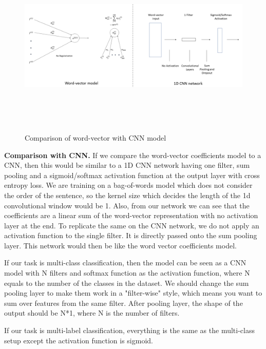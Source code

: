 \begin{figure}[htbp]
\centering
\includegraphics[width=16cm, height=8cm]{images/wv-cnn.png}\\
\centering
\caption{Comparison of word-vector with CNN model}
\label{fig:foo}
\end{figure}
\textbf{Comparison with CNN.} If we compare the word-vector coefficients model to a CNN, then this would be similar to a 1D CNN network having one filter, sum pooling and a sigmoid/softmax activation function at the output layer with cross entropy loss. We are training on a bag-of-words model which does not consider the order of the sentence, so the kernel size which decides the length of the 1d convolutional window would be 1. Also, from our network we can see that the coefficients are a linear sum of the word-vector representation with no activation layer at the end. To replicate the same on the CNN network, we do not apply an activation function to the single filter. It is directly passed onto the sum pooling layer. This network would then be like the word vector coefficients model.

If our task is multi-class classification, then the model can be seen as a CNN model with N filters and softmax function as the activation function, where N equals to the number of the classes in the dataset. We should change the sum pooling layer to make them work in a "filter-wise" style, which means you want to sum over features from the same filter. After pooling layer, the shape of the output should be N*1, where N is the number of filters.

If our task is multi-label classification, everything is the same as the multi-class setup except the activation function is sigmoid.






